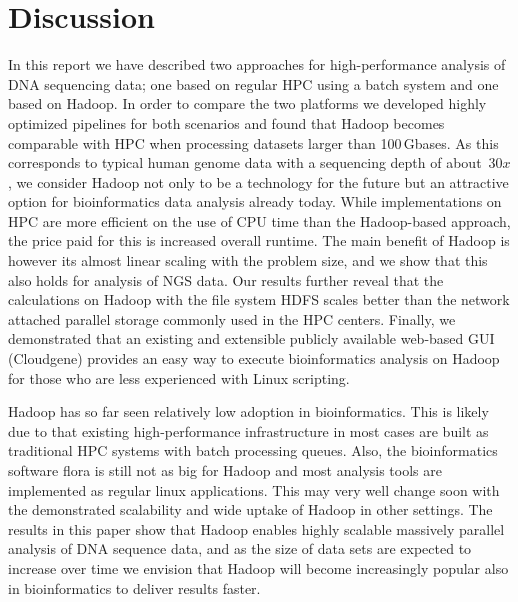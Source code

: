 \documentclass[10pt]{article}
\begin{document}
\section*{Discussion}

In this report we have described two approaches for high-performance analysis of
DNA sequencing data; one based on regular HPC using a batch system and one based
on Hadoop. In order to compare the two platforms we developed highly optimized pipelines
for both scenarios and found that Hadoop becomes comparable with HPC when processing
datasets larger than 100\,Gbases. As this corresponds to typical human genome data with a sequencing depth of about~$30x$, we consider Hadoop not only to be a technology for the future but an attractive option for bioinformatics data analysis already today. While implementations on HPC are more efficient on the use of CPU time than the Hadoop-based approach, the price paid for this is increased overall runtime.
The main benefit of Hadoop is however its almost linear scaling with the problem size, and we show that this also holds for analysis of NGS data.
Our results further reveal that the calculations on Hadoop with the file system HDFS scales
better than the network attached parallel storage commonly used in the HPC centers.  
Finally, we demonstrated that an existing and extensible
publicly available web-based GUI (Cloudgene) provides an easy way to execute
bioinformatics analysis on Hadoop for those who are less experienced with Linux
scripting.

Hadoop has so far seen relatively low adoption in bioinformatics. This is likely due to that existing high-performance infrastructure in most cases are built as traditional HPC systems with batch processing queues. Also, the bioinformatics software flora is still not as big for Hadoop and most analysis tools are implemented as regular linux applications. This may very well change soon with the demonstrated scalability and wide uptake of Hadoop in other settings. The results in this paper show that Hadoop enables highly scalable massively parallel analysis of DNA sequence data, and as the size of data sets are expected to increase over time we envision that Hadoop will become increasingly popular also in bioinformatics to deliver results faster.





\end{document}
